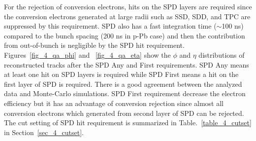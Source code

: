 {For the rejection of conversion electrons, hits on the SPD layers are required since the conversion electrons generated at large radii such as SSD, SDD, and TPC are suppressed by this requirement. 
SPD also has a fast integration time ($\sim$100 ns) compared to the bunch spacing (200 ns in p-Pb case) and then the contribution from out-of-bunch is negligible by the SPD hit requirement. 
Figures~\ref{fig_4_qa_phi} and ~\ref{fig_4_qa_eta} show the $\phi$ and $\eta$ distributions of reconstructed tracks after the SPD Any and First requirements. 
SPD Any means at least one hit on SPD layers is required while SPD First means a hit on the first layer of SPD is required. 
There is a good agreement between the analyzed data and Monte-Carlo simulations. 
SPD First requirement decrease the electron efficiency but it has an advantage of conversion rejection since almost all conversion electrons which generated from second layer of SPD can be rejected. 
The cut setting of SPD hit requirement is summarized in Table.~\ref{table_4_cutset} in Section~\ref{sec_4_cutset}.

}
